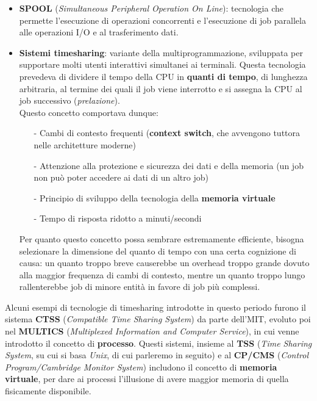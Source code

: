\documentclass[12pt, letterpaper]{article}
\begin{document}
\begin{itemize}
    \item \textbf{SPOOL} (\textit{Simultaneous Peripheral Operation On Line}): tecnologia che permette l'esecuzione di operazioni concorrenti e l'esecuzione di job parallela alle operazioni I/O e al trasferimento dati.
    \item \textbf{Sistemi timesharing}: variante della multiprogrammazione, sviluppata per supportare molti utenti interattivi simultanei ai terminali. Questa tecnologia prevedeva di dividere il tempo della CPU in \textbf{quanti di tempo}, di lunghezza arbitraria, al termine dei quali il job viene interrotto e si assegna la CPU al job successivo (\textit{prelazione}). \\
    Questo concetto comportava dunque:
    \begin{itemize}
    \item[-] Cambi di contesto frequenti (\textbf{context switch}, che avvengono tuttora nelle architetture moderne)
    \item[-] Attenzione alla protezione e sicurezza dei dati e della memoria (un job non può poter accedere ai dati di un altro job)
    \item[-] Principio di sviluppo della tecnologia della \textbf{memoria virtuale}
    \item[-] Tempo di risposta ridotto a minuti/secondi
    \end{itemize}
    Per quanto questo concetto possa sembrare estremamente efficiente, bisogna selezionare la dimensione del quanto di tempo con una certa cognizione di causa: un quanto troppo breve causerebbe un overhead troppo grande dovuto alla maggior frequenza di cambi di contesto, mentre un quanto troppo lungo rallenterebbe job di minore entità in favore di job più complessi. \\
\end{itemize}
Alcuni esempi di tecnologie di timesharing introdotte in questo periodo furono il sistema \textbf{CTSS} (\textit{Compatible Time Sharing System}) da parte dell'MIT, evoluto poi nel \textbf{MULTICS} (\textit{Multiplexed Information and Computer Service}), in cui venne introdotto il concetto di \textbf{processo}. Questi sistemi, insieme al \textbf{TSS} (\textit{Time Sharing System}, su cui si basa \textit{Unix}, di cui parleremo in seguito) e al \textbf{CP/CMS} (\textit{Control Program/Cambridge Monitor System}) includono il concetto di \textbf{memoria virtuale}, per dare ai processi l'illusione di avere maggior memoria di quella fisicamente disponibile. \\
\end{document}
